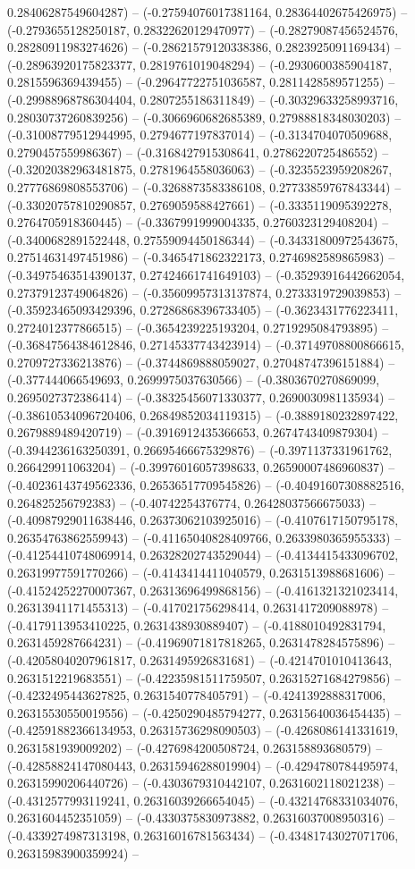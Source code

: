0.28406287549604287) -- (-0.27594076017381164, 0.28364402675426975) -- (-0.2793655128250187, 0.28322620129470977) -- (-0.28279087456524576, 0.28280911983274626) -- (-0.28621579120338386, 0.2823925091169434) -- (-0.28963920175823377, 0.2819761019048294) -- (-0.2930600385904187, 0.2815596369439455) -- (-0.29647722751036587, 0.2811428589571255) -- (-0.29988968786304404, 0.2807255186311849) -- (-0.30329633258993716, 0.28030737260839256) -- (-0.3066960682685389, 0.27988818348030203) -- (-0.31008779512944995, 0.2794677197837014) -- (-0.3134704070509688, 0.2790457559986367) -- (-0.3168427915308641, 0.2786220725486552) -- (-0.32020382963481875, 0.2781964558036063) -- (-0.3235523959208267, 0.27776869808553706) -- (-0.3268873583386108, 0.27733859767843344) -- (-0.33020757810290857, 0.2769059588427661) -- (-0.3335119095392278, 0.2764705918360445) -- (-0.3367991999004335, 0.2760323129408204) -- (-0.3400682891522448, 0.27559094450186344) -- (-0.34331800972543675, 0.27514631497451986) -- (-0.3465471862322173, 0.2746982589865983) -- (-0.34975463514390137, 0.27424661741649103) -- (-0.35293916442662054, 0.27379123749064826) -- (-0.35609957313137874, 0.2733319729039853) -- (-0.35923465093429396, 0.27286868396733405) -- (-0.3623431776223411, 0.2724012377866515) -- (-0.3654239225193204, 0.2719295084793895) -- (-0.36847564384612846, 0.27145337743423914) -- (-0.37149708800866615, 0.2709727336213876) -- (-0.3744869888059027, 0.27048747396151884) -- (-0.377444066549693, 0.2699975037630566) -- (-0.3803670270869099, 0.2695027372386414) -- (-0.38325456071330377, 0.2690030981135934) -- (-0.38610534096720406, 0.26849852034119315) -- (-0.3889180232897422, 0.2679889489420719) -- (-0.3916912435366653, 0.2674743409879304) -- (-0.3944236163250391, 0.26695466675329876) -- (-0.3971137331961762, 0.266429911063204) -- (-0.39976016057398633, 0.26590007486960837) -- (-0.40236143749562336, 0.26536517709545826) -- (-0.40491607308882516, 0.264825256792383) -- (-0.40742254376774, 0.26428037566675033) -- (-0.40987929011638446, 0.26373062103925016) -- (-0.4107617150795178, 0.26354763862559943) -- (-0.41165040828409766, 0.2633980365955333) -- (-0.41254410748069914, 0.26328202743529044) -- (-0.4134415433096702, 0.26319977591770266) -- (-0.4143414411040579, 0.2631513988681606) -- (-0.41524252270007367, 0.26313696499868156) -- (-0.4161321321023414, 0.26313941171455313) -- (-0.417021756298414, 0.2631417209088978) -- (-0.4179113953410225, 0.2631438930889407) -- (-0.4188010492831794, 0.2631459287664231) -- (-0.41969071817818265, 0.2631478284575896) -- (-0.42058040207961817, 0.2631495926831681) -- (-0.4214701010413643, 0.2631512219683551) -- (-0.42235981511759507, 0.26315271684279856) -- (-0.4232495443627825, 0.2631540778405791) -- (-0.4241392888317006, 0.26315530550019556) -- (-0.4250290485794277, 0.26315640036454435) -- (-0.42591882366134953, 0.26315736298090503) -- (-0.4268086141331619, 0.2631581939009202) -- (-0.4276984200508724, 0.263158893680579) -- (-0.42858824147080443, 0.26315946288019904) -- (-0.4294780784495974, 0.26315990206440726) -- (-0.4303679310442107, 0.2631602118021238) -- (-0.4312577993119241, 0.26316039266654045) -- (-0.43214768331034076, 0.2631604452351059) -- (-0.4330375830973882, 0.26316037008950316) -- (-0.4339274987313198, 0.26316016781563434) -- (-0.43481743027071706, 0.26315983900359924) -- 